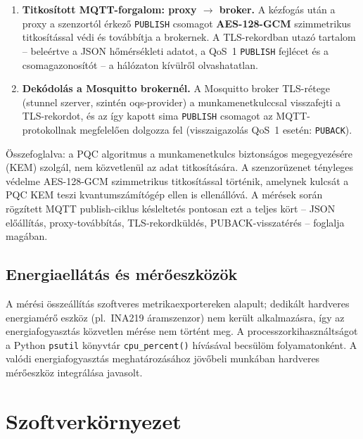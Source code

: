 \begin{enumerate}
    \item \textbf{Titkosított MQTT-forgalom: proxy $\to$ broker.}
    A kézfogás után a proxy a szenzortól érkező \texttt{PUBLISH} csomagot
    \textbf{AES-128-GCM} szimmetrikus titkosítással védi és továbbítja a brokernek.
    A TLS-rekordban utazó tartalom -- beleértve a JSON hőmérsékleti adatot, a
    QoS~1 \texttt{PUBLISH} fejlécet és a csomagazonosítót -- a hálózaton kívülről
    olvashatatlan.

    \item \textbf{Dekódolás a Mosquitto brokernél.}
    A Mosquitto broker TLS-rétege (stunnel szerver, szintén oqs-provider) a
    munkamenetkulccsal visszafejti a TLS-rekordot, és az így kapott sima
    \texttt{PUBLISH} csomagot az MQTT-protokollnak megfelelően dolgozza fel
    (visszaigazolás QoS~1 esetén: \texttt{PUBACK}).

\end{enumerate}

Összefoglalva: a PQC algoritmus a munkamenetkulcs biztonságos megegyezésére
(KEM) szolgál, nem közvetlenül az adat titkosítására. A szenzorüzenet tényleges
védelme AES-128-GCM szimmetrikus titkosítással történik, amelynek kulcsát a PQC KEM
teszi kvantumszámítógép ellen is ellenállóvá. A mérések során rögzített MQTT
publish-ciklus késleltetés pontosan ezt a teljes kört -- JSON előállítás,
proxy-továbbítás, TLS-rekordküldés, PUBACK-visszatérés -- foglalja magában.

\subsection{Energiaellátás és mérőeszközök}

A mérési összeállítás szoftveres metrikaexportereken alapult; dedikált hardveres energiamérő
eszköz (pl.\ INA219 áramszenzor) nem került alkalmazásra, így az energiafogyasztás közvetlen
mérése nem történt meg. A processzorkihasználtságot a Python \texttt{psutil} könyvtár
\texttt{cpu\_percent()} hívásával becsülöm folyamatonként. A valódi energiafogyasztás
meghatározásához jövőbeli munkában hardveres mérőeszköz integrálása javasolt.

\section{Szoftverkörnyezet}

